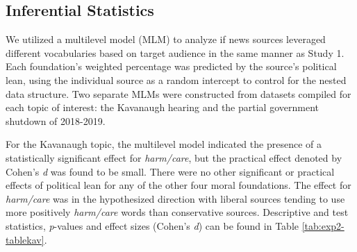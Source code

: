 \documentclass[
  man,floatsintext]{apa6}
\begin{document}
\hypertarget{inferential-statistics-1}{%
\subsection{Inferential Statistics}\label{inferential-statistics-1}}

We utilized a multilevel model (MLM) to analyze if news sources leveraged different vocabularies based on target audience in the same manner as Study 1. Each foundation's weighted percentage was predicted by the source's political lean, using the individual source as a random intercept to control for the nested data structure. Two separate MLMs were constructed from datasets compiled for each topic of interest: the Kavanaugh hearing and the partial government shutdown of 2018-2019.

For the Kavanaugh topic, the multilevel model indicated the presence of a statistically significant effect for \emph{harm/care}, but the practical effect denoted by Cohen's \emph{d} was found to be small. There were no other significant or practical effects of political lean for any of the other four moral foundations. The effect for \emph{harm/care} was in the hypothesized direction with liberal sources tending to use more positively \emph{harm/care} words than conservative sources. Descriptive and test statistics, \emph{p}-values and effect sizes (Cohen's \emph{d}) can be found in Table \ref{tab:exp2-tablekav}.
\end{document}
